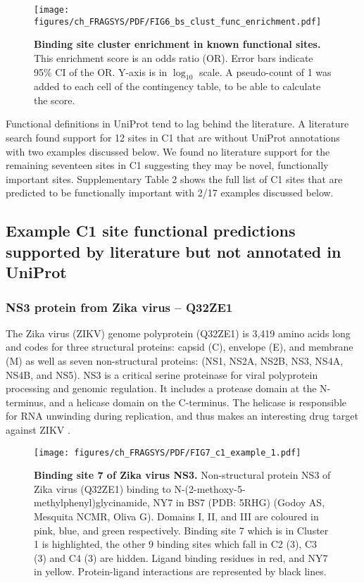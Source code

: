 \begin{figure}[h]
    \centering
    \texttt{[image: figures/ch\_FRAGSYS/PDF/FIG6\_bs\_clust\_func\_enrichment.pdf]}
    \caption[Binding site cluster enrichment in known functional sites]{\textbf{Binding site cluster enrichment in known functional sites.} This enrichment score is an odds ratio (OR). Error bars indicate 95\% CI of the OR. Y-axis is in $\log_{10}$ scale. A pseudo-count of 1 was added to each cell of the contingency table, to be able to calculate the score.}
    \label{fig:bs_clusts_enrichment}
\end{figure}

Functional definitions in UniProt tend to lag behind the literature. A literature search found support for 12 sites in C1 that are without UniProt annotations with two examples discussed below. We found no literature support for the remaining seventeen sites in C1 suggesting they may be novel, functionally important sites.  Supplementary Table 2 shows the full list of C1 sites that are predicted to be functionally important with 2/17 examples discussed below.

\subsection{Example C1 site functional predictions supported by literature but not annotated in UniProt}

\subsubsection{NS3 protein from Zika virus -- Q32ZE1}

The Zika virus (ZIKV) genome polyprotein (Q32ZE1) is 3,419 amino acids long and codes for three structural proteins: capsid (C), envelope (E), and membrane (M) as well as seven non-structural proteins: (NS1, NS2A, NS2B, NS3, NS4A, NS4B, and NS5). NS3 is a critical serine proteinase for viral polyprotein processing and genomic regulation. It includes a protease domain at the N-terminus, and a helicase domain on the C-terminus. The helicase is responsible for RNA unwinding during replication, and thus makes an interesting drug target against ZIKV \cite{LUO_2015_FLAVIVIRUS}.

\begin{figure}[h]
    \centering
    \texttt{[image: figures/ch\_FRAGSYS/PDF/FIG7\_c1\_example\_1.pdf]}
    \caption[Binding site 7 of Zika virus NS3]{\textbf{Binding site 7 of Zika virus NS3.} Non-structural protein NS3 of Zika virus (Q32ZE1) binding to N-(2-methoxy-5-methylphenyl)glycinamide, NY7 in BS7 (PDB: 5RHG) (Godoy AS, Mesquita NCMR, Oliva G). Domains I, II, and III are coloured in pink, blue, and green respectively. Binding site 7 which is in Cluster 1 is highlighted, the other 9 binding sites which fall in C2 (3), C3 (3) and C4 (3) are hidden. Ligand binding residues in red, and NY7 in yellow. Protein-ligand interactions are represented by black lines.}
    \label{fig:c1_example_1}
\end{figure}

